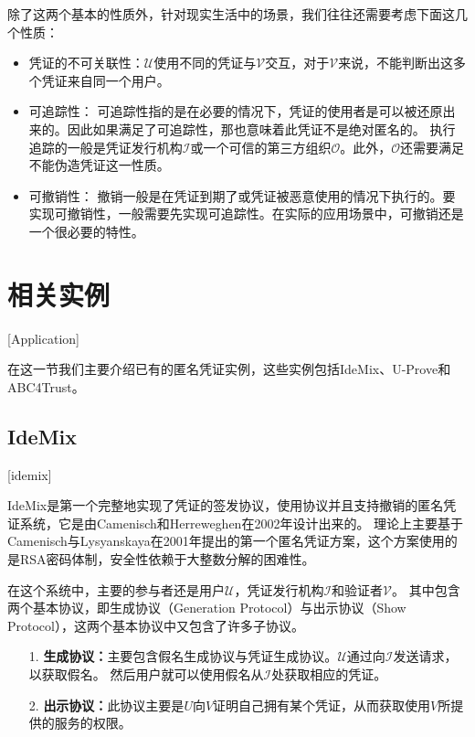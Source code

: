 除了这两个基本的性质外，针对现实生活中的场景，我们往往还需要考虑下面这几个性质：

\begin{itemize}
  \item 凭证的不可关联性：$\mathcal{U}$使用不同的凭证与$\mathcal{V}$交互，对于$\mathcal{V}$来说，不能判断出这多个凭证来自同一个用户。
  \item 可追踪性： 可追踪性指的是在必要的情况下，凭证的使用者是可以被还原出来的。因此如果满足了可追踪性，那也意味着此凭证不是绝对匿名的。
  执行追踪的一般是凭证发行机构$\mathcal{I}$或一个可信的第三方组织$\mathcal{O}$。此外，$\mathcal{O}$还需要满足不能伪造凭证这一性质。
  \item 可撤销性： 撤销一般是在凭证到期了或凭证被恶意使用的情况下执行的。要实现可撤销性，一般需要先实现可追踪性。在实际的应用场景中，可撤销还是一个很必要的特性。
\end{itemize}

\section{相关实例}[Application]

在这一节我们主要介绍已有的匿名凭证实例，这些实例包括IdeMix、U-Prove和ABC4Trust。

\subsection{IdeMix}[idemix]

IdeMix\cite{camenisch2002design}是第一个完整地实现了凭证的签发协议，使用协议并且支持撤销的匿名凭证系统，它是由Camenisch和Herreweghen在2002年设计出来的。
理论上主要基于Camenisch与Lysyanskaya在2001年提出的第一个匿名凭证方案\cite{camenisch2001efficient}，这个方案使用的是RSA密码体制，安全性依赖于大整数分解的困难性。

在这个系统中，主要的参与者还是用户$\mathcal{U}$，凭证发行机构$\mathcal{I}$和验证者$\mathcal{V}$。
其中包含两个基本协议，即生成协议（Generation Protocol）与出示协议（Show Protocol），这两个基本协议中又包含了许多子协议。

\begin{itemize}
  \item[1.] \textbf{生成协议：}主要包含假名生成协议与凭证生成协议。$\mathcal{U}$通过向$\mathcal{I}$发送请求，以获取假名。
  然后用户就可以使用假名从$\mathcal{I}$处获取相应的凭证。
  \item[2.] \textbf{出示协议：}此协议主要是$U$向$V$证明自己拥有某个凭证，从而获取使用$V$所提供的服务的权限。
\end{itemize}

